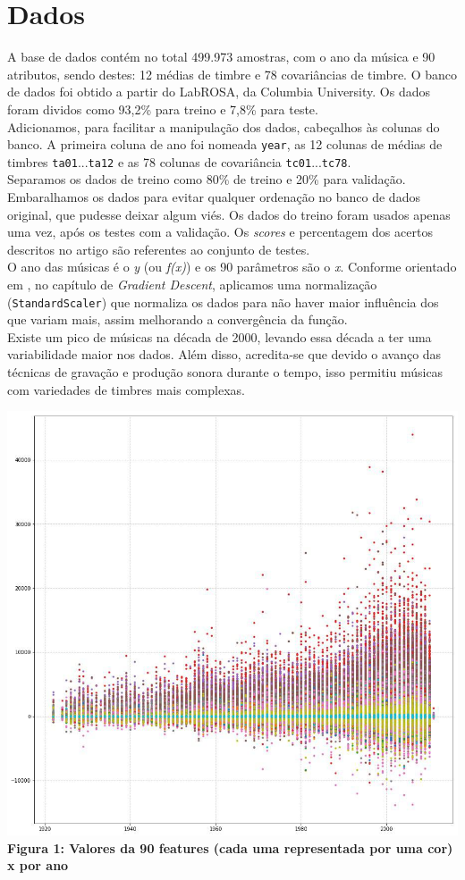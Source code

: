 \documentclass[conference]{IEEEtran}
\begin{document}
\section{Dados}
A base de dados contém no total 499.973 amostras, com o ano da música e 90 atributos, sendo destes: 12 médias de timbre e 78 covariâncias de timbre. O banco de dados foi obtido a partir do LabROSA\cite{b2}, da Columbia University. Os dados foram dividos como 93,2\% para treino e 7,8\% para teste.\\
Adicionamos, para facilitar a manipulação dos dados, cabeçalhos às colunas do banco. A primeira coluna de ano foi nomeada \texttt{year}, as 12 colunas de médias de timbres \texttt{ta01}...\texttt{ta12} e as 78 colunas de covariância \texttt{tc01}...\texttt{tc78}. \\
Separamos os dados de treino como 80\% de treino e 20\% para validação. Embaralhamos os dados para evitar qualquer ordenação no banco de dados original, que pudesse deixar algum viés. Os dados do treino foram usados apenas uma vez, após os testes com a validação.  Os \textit{scores} e percentagem dos acertos descritos no artigo são referentes ao conjunto de testes.\\
O ano das músicas é o \textit{y} (ou \textit{f(x)}) e os 90 parâmetros são o \textit{x}. Conforme orientado em \cite{b3}, no capítulo de \textit{Gradient Descent}, aplicamos uma normalização (\texttt{StandardScaler}) que normaliza os dados para não haver maior influência dos que variam mais, assim melhorando a convergência da função.\\
Existe um pico de músicas na década de 2000, levando essa década a ter uma variabilidade maior nos dados. Além disso, acredita-se que devido o avanço das técnicas de gravação e produção sonora durante o tempo, isso permitiu músicas com variedades de timbres mais complexas.

\begin{center}
\includegraphics[scale=0.25]{plot0}
\\
\textbf{Figura 1: Valores da 90 features (cada uma representada por uma cor) x por ano}
\end{center}
\end{document}
